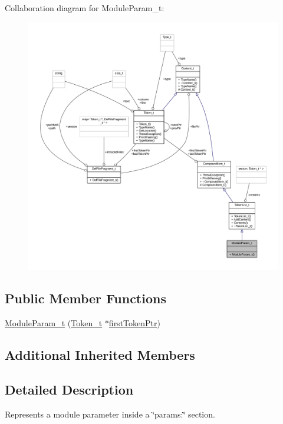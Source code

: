Collaboration diagram for Module\+Param\+\_\+t\+:
\nopagebreak
\begin{figure}[H]
\begin{center}
\leavevmode
\includegraphics[width=350pt]{struct_module_param__t__coll__graph}
\end{center}
\end{figure}
\subsection*{Public Member Functions}
\begin{DoxyCompactItemize}
\item 
\hyperlink{struct_module_param__t_a7f8734e34b4fc9fa92102dcc64b8842e}{Module\+Param\+\_\+t} (\hyperlink{struct_token__t}{Token\+\_\+t} $\ast$\hyperlink{struct_compound_item__t_a4d95dc788120f627e332491589d20c5c}{first\+Token\+Ptr})
\end{DoxyCompactItemize}
\subsection*{Additional Inherited Members}


\subsection{Detailed Description}
Represents a module parameter inside a \char`\"{}params\+:\char`\"{} section. 

